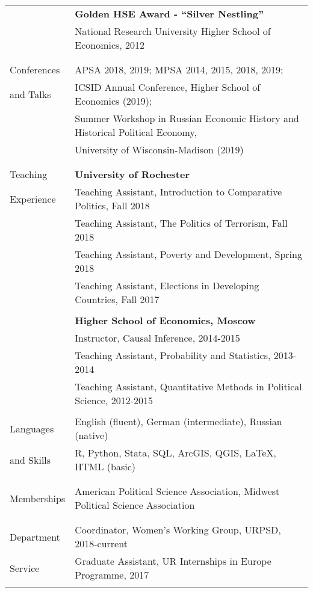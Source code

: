 \documentclass[letterpaper,11pt,oneside]{article}
\begin{document}
\begin{tabular}{@{} l l}
          & \textbf{Golden HSE Award - ``Silver Nestling''} \\
          & National Research University Higher School of Economics, 2012 \\
&           \\
& \\ 
\Large{Conferences }    
& APSA 2018, 2019; MPSA 2014, 2015, 2018, 2019;  \\
\Large{and Talks}   &  ICSID Annual Conference, Higher School of Economics (2019);\\
&Summer Workshop in Russian Economic History and Historical Political Economy,\\
& University of Wisconsin-Madison (2019)\\
 & \\
 & \\
  \Large{Teaching}  
 &\textbf{University of Rochester} \\
 \Large{Experience}   & Teaching Assistant, Introduction to Comparative Politics, Fall 2018 \\
 & Teaching Assistant, The Politics of Terrorism, Fall 2018 \\
 & Teaching Assistant, Poverty and Development, Spring 2018 \\
 & Teaching Assistant, Elections in Developing Countries, Fall 2017 \\
 \\
 &\textbf{Higher School of Economics, Moscow} \\
 & Instructor, Causal Inference, 2014-2015 \\
 & Teaching Assistant, Probability and Statistics, 2013-2014 \\
 & Teaching Assistant, Quantitative Methods in Political Science, 2012-2015 \\
 &\\ 
 \Large{Languages}   & English (fluent), German (intermediate), Russian (native) \\
\Large{and Skills}   & R, Python, Stata, SQL, ArcGIS, QGIS, \LaTeX , HTML (basic)   \\
& \\
& \\
 \Large{Memberships}   &  American Political Science Association, Midwest Political Science Association \\
& \\
& \\
\Large{Department} & Coordinator, Women's Working Group,  URPSD,  2018-current\\
\Large{Service} & Graduate Assistant, UR Internships in Europe Programme,  2017\\

\vspace{3em}
\end{tabular}
\end{document}
